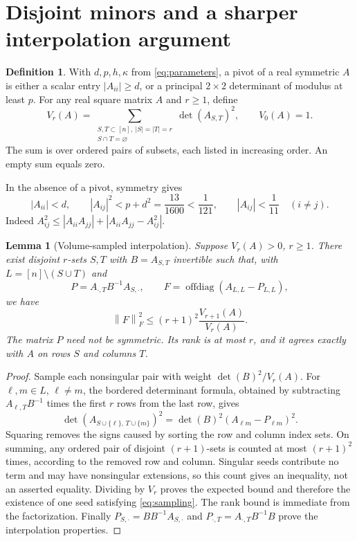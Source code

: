 \documentclass[11pt]{article}
\numberwithin{equation}{section}
\newtheorem{lemma}[theorem]{Lemma}
\theoremstyle{definition}\newtheorem{definition}[theorem]{Definition}
\theoremstyle{remark}\newtheorem{remark}[theorem]{Remark}
\newcommand{\1}{\mathbf 1}\newcommand{\diag}{\operatorname{diag}}
\newcommand{\off}{\operatorname{offdiag}}\newcommand{\supp}{\operatorname{supp}}
\newcommand{\norm}[1]{\left\lVert#1\right\rVert}\newcommand{\abs}[1]{\left|#1\right|}
\begin{document}
\section{Disjoint minors and a sharper interpolation argument}\label{sec:skeleton}
\begin{definition}\label{def:pivot-volume}
With $d,p,h,\kappa$ from \eqref{eq:parameters}, a pivot of a real symmetric $A$ is either a scalar entry $|A_{ii}|\ge d$, or a principal $2\times2$ determinant of modulus at least $p$. For any real square matrix $A$ and $r\ge1$, define
\begin{equation}\label{eq:Vr}
 V_r(A)=\sum_{\substack{S,T\subset[n],\ |S|=|T|=r\\S\cap T=\varnothing}}\det(A_{S,T})^2,
 \qquad V_0(A)=1.
\end{equation}
The sum is over ordered pairs of subsets, each listed in increasing order. An empty sum equals zero.
\end{definition}
In the absence of a pivot, symmetry gives
\begin{equation}\label{eq:small-entry}
 |A_{ii}|<d,\qquad |A_{ij}|^2<p+d^2=\frac{13}{1600}<\frac1{121},
 \qquad |A_{ij}|<\frac1{11}\quad(i\ne j).
\end{equation}
Indeed $A_{ij}^2\le |A_{ii}A_{jj}|+|A_{ii}A_{jj}-A_{ij}^2|$.

\begin{lemma}[Volume-sampled interpolation]\label{lem:sampling}
Suppose $V_r(A)>0$, $r\ge1$. There exist disjoint $r$-sets $S,T$ with $B=A_{S,T}$ invertible such that, with $L=[n]\setminus(S\cup T)$ and
\begin{equation}\label{eq:P}
 P=A_{\cdot,T}B^{-1}A_{S,\cdot},\qquad
 F=\off(A_{L,L}-P_{L,L}),
\end{equation}
we have
\begin{equation}\label{eq:sampling}
 \norm F_F^2\le(r+1)^2\frac{V_{r+1}(A)}{V_r(A)}.
\end{equation}
The matrix $P$ need not be symmetric. Its rank is at most $r$, and it agrees exactly with $A$ on rows $S$ and columns $T$.
\end{lemma}
\begin{proof}
Sample each nonsingular pair with weight $\det(B)^2/V_r(A)$. For $\ell,m\in L$, $\ell\ne m$, the bordered determinant formula, obtained by subtracting $A_{\ell,T}B^{-1}$ times the first $r$ rows from the last row, gives
\[
 \det(A_{S\cup\{\ell\},\,T\cup\{m\}})^2
 =\det(B)^2(A_{\ell m}-P_{\ell m})^2.
\]
Squaring removes the signs caused by sorting the row and column index sets. On summing, any ordered pair of disjoint $(r+1)$-sets is counted at most $(r+1)^2$ times, according to the removed row and column. Singular seeds contribute no term and may have nonsingular extensions, so this count gives an inequality, not an asserted equality. Dividing by $V_r$ proves the expected bound and therefore the existence of one seed satisfying \eqref{eq:sampling}. The rank bound is immediate from the factorization. Finally $P_{S,\cdot}=BB^{-1}A_{S,\cdot}$ and $P_{\cdot,T}=A_{\cdot,T}B^{-1}B$ prove the interpolation properties.
\end{proof}
\end{document}
